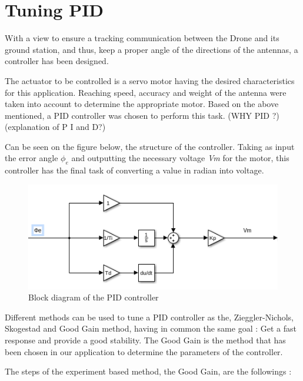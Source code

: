 \chapter{Tuning PID}\label{ch:Tuning_PID}

With a view to ensure a tracking communication between the Drone and its ground station, and thus, keep a proper angle of the directions of the antennas, a controller has been designed.\par

The actuator to be controlled is a servo motor having the desired characteristics for this application.  Reaching speed, accuracy and weight of the antenna were taken into account to determine the appropriate motor. Based on the above mentioned, a PID controller was chosen to perform this task. (WHY PID ?) (explanation of P I and D?)\par

Can be seen on the figure below, the structure of the controller. Taking as input the error angle \textbf{$\phi_{e}$} and outputting the necessary voltage \textit{Vm} for the motor, this controller has the final task of converting a value in radian into voltage.\par

\begin{figure}[H]
  \centering
  \includegraphics[scale=0.5]{figures/PID_2D.png}
  \caption[LABEL] {Block diagram of the PID controller}
\end{figure}
  
Different methods can be used to tune a PID controller as the, Zieggler-Nichols, Skogestad and Good Gain method, having in common the same goal : Get a fast response and provide a good stability. The Good Gain is the method that has been chosen in our application to determine the parameters of the controller.\par
  
The steps of the experiment based method, the Good Gain, are the followings :\par 
  
